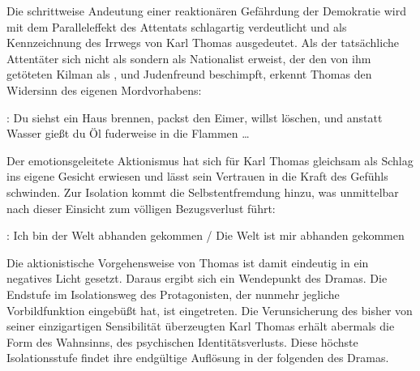 Die schrittweise Andeutung einer reaktionären Gefährdung der Demokratie wird
mit dem  Paralleleffekt des Attentats schlagartig verdeutlicht und als
Kennzeichnung des Irrwegs von Karl Thomas ausgedeutet. Als der tatsächliche
Attentäter sich nicht als \Cite{Genosse} sondern als Nationalist
erweist,
der den von ihm getöteten Kilman als \Cite{Revolutionär}, \Cite{Bolschewiki}
und Judenfreund beschimpft, erkennt Thomas den Widersinn des eigenen Mordvorhabens:

\begin{BlockQuote}
: Du siehst ein Haus brennen, packst den Eimer, willst
löschen, und anstatt Wasser gießt du Öl fuderweise in die Flammen \ldots
{}
\end{BlockQuote}
Der emotionsgeleitete Aktionismus hat sich für Karl Thomas gleichsam als
Schlag ins eigene Gesicht erwiesen und lässt sein Vertrauen in die Kraft des
Gefühls schwinden. Zur Isolation kommt die Selbstentfremdung hinzu, was
 unmittelbar nach dieser Einsicht zum völligen Bezugsverlust führt:

\begin{BlockQuote}
: Ich bin der Welt abhanden gekommen / Die Welt ist mir
abhanden gekommen
\end{BlockQuote}
Die aktionistische Vorgehensweise von Thomas ist damit eindeutig in ein
negatives Licht gesetzt. Daraus ergibt sich ein Wendepunkt des Dramas. Die
Endstufe im Isolationsweg des Protagonisten, der nunmehr jegliche
Vorbildfunktion eingebüßt hat, ist eingetreten.
Die Verunsicherung des bisher von seiner einzigartigen Sensibilität
überzeugten Karl Thomas erhält abermals die Form des Wahnsinns, des
psychischen Identitätsverlusts. Diese höchste Isolationsstufe findet 
ihre endgültige Auflösung in der folgenden  des
Dramas.


